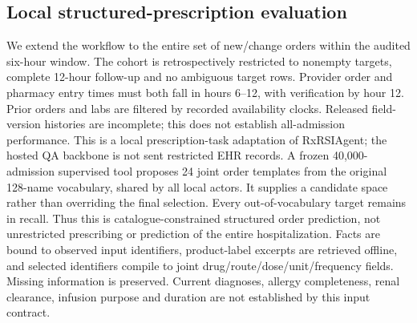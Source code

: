 \subsection{Local structured-prescription evaluation}\label{sec:local-orders}
We extend the workflow to the entire set of new/change orders within the audited six-hour window. The cohort is retrospectively restricted to nonempty targets, complete 12-hour follow-up and no ambiguous target rows. Provider order and pharmacy entry times must both fall in hours 6--12, with verification by hour 12. Prior orders and labs are filtered by recorded availability clocks. Released field-version histories are incomplete; this does not establish all-admission performance. This is a local prescription-task adaptation of RxRSIAgent; the hosted QA backbone is not sent restricted EHR records. A frozen 40,000-admission supervised tool proposes 24 joint order templates from the original 128-name vocabulary, shared by all local actors. It supplies a candidate space rather than overriding the final selection. Every out-of-vocabulary target remains in recall. Thus this is catalogue-constrained structured order prediction, not unrestricted prescribing or prediction of the entire hospitalization. Facts are bound to observed input identifiers, product-label excerpts are retrieved offline, and selected identifiers compile to joint drug/route/dose/unit/frequency fields. Missing information is preserved. Current diagnoses, allergy completeness, renal clearance, infusion purpose and duration are not established by this input contract.

